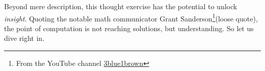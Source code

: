 Beyond mere description, this thought exercise has the potential to unlock
\textit{insight}. Quoting the notable math communicator Grant
Sanderson\footnote{From the YouTube channel
\href{https://www.youtube.com/channel/UCYO_jab_esuFRV4b17AJtAw}{3blue1brown}}(loose
quote), the point of computation is not reaching solutions, but understanding.
So let us dive right in.